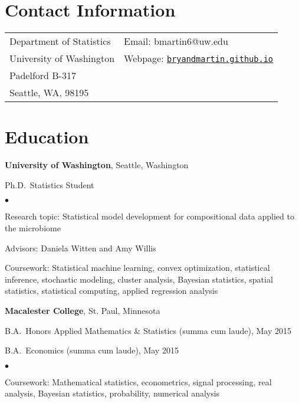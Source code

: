 \documentclass[margin,centered]{res}
\newenvironment{list1}{
  \begin{list}{\ding{113}}{%
      \setlength{\itemsep}{0in}
      \setlength{\parsep}{0in} \setlength{\parskip}{0in}
      \setlength{\topsep}{0in} \setlength{\partopsep}{0in}
      \setlength{\leftmargin}{0.17in}}}{\end{list}}
\newenvironment{list2}{
  \begin{list}{$\bullet$}{%
      \setlength{\itemsep}{0in}
      \setlength{\parsep}{0in} \setlength{\parskip}{0in}
      \setlength{\topsep}{0in} \setlength{\partopsep}{0in}
      \setlength{\leftmargin}{0.2in}}}{\end{list}}
\begin{document}
\vspace*{.1in}


\begin{resume}

\section{\sc Contact Information}

\vspace{.05in}
\begin{tabular}{@{}p{2.0in}p{2.9in}}
Department of Statistics& Email:  bmartin6@uw.edu \\
University of Washington  &Webpage: \href{https://bryandmartin.github.io/}{\texttt{bryandmartin.github.io}}
\\
Padelford B-317		                   	   \\
Seattle, WA, 98195             & \\






\end{tabular}

\section{\sc Education}
{\bf University of Washington}, Seattle, Washington
\begin{list1}
\item[] 
Ph.D.~Statistics Student
\begin{list2}
\vspace*{.05in}
\item Research topic: Statistical model development for compositional data applied to the microbiome
\item Advisors: Daniela Witten and Amy Willis
\item Coursework: Statistical machine learning, convex optimization, statistical inference, stochastic modeling, cluster analysis, Bayesian statistics, spatial statistics, statistical computing, applied regression analysis
\end{list2}
\end{list1}



{\bf Macalester College}, St. Paul, Minnesota
\begin{list1}
\item[] B.A.~Honors Applied Mathematics \& Statistics (summa cum laude), May 2015
\item[] B.A.~Economics (summa cum laude), May 2015
\begin{list2}
\vspace*{.05in}
\item Coursework: Mathematical statistics, econometrics, signal processing, real analysis, Bayesian statistics, probability, numerical analysis
\end{list2}
\end{list1}



\end{resume}
\end{document}

